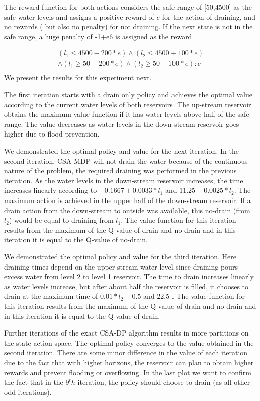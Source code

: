 The reward function for both actions considers the safe range of [50,4500] as the safe water levels and assigns a positive reward of $e$ for the action of draining, and no rewards ( but also no penalty) for not draining. If the next state is not in the safe range, a huge penalty of -1+e6 is assigned as the reward.

{\footnotesize
\begin{align*}
(l_1\leq 4500 - 200 * e) \wedge (l_2 \leq 4500 +100 *e) \\
\wedge (l_1\geq 50 - 200 * e) \wedge (l_2 \geq 50 +100 *e) : e \\
\end{align*}
}
We present the results for this experiment next. 

The first iteration starts with a drain only policy and achieves the optimal value according to the current water levels of both reservoirs. The up-stream reservoir obtains the maximum value function if it has water levels above half of the safe range. The value decreases as water levels in the down-stream reservoir goes higher due to flood prevention. 

We demonstrated the optimal policy and value for the next iteration. 
In the second iteration, CSA-MDP will not drain the water because of the continuous nature of the problem, the required draining was performed in the previous iteration. As the water levels in the down-stream reservoir increases, the time increases linearly according to $-0.1667 + 0.0033*l_1$ and $11.25 - 0.0025 *l_2$. The maximum action is achieved in the upper half of the down-stream reservoir. If a drain action from the down-stream to outside was available, this no-drain (from $l_2$) would be equal to draining from $l_1$. The value function for this iteration results from the maximum of the Q-value of drain and no-drain and in this iteration it is equal to the Q-value of no-drain. 


We demonstrated the optimal policy and value for the third iteration. Here draining times depend on the upper-stream water level since draining pours excess water from level 2 to level 1 reservoir. The time to drain increases linearly as water levels increase, but after about half the reservoir is filled, it chooses to drain at the maximum time of $0.01 *l_2 - 0.5$ and $22.5$ .  The value function for this iteration results from the maximum of the Q-value of drain and no-drain and in this iteration it is equal to the Q-value of drain. 

Further iterations of the exact CSA-DP algorithm results in more partitions on the state-action space. The optimal policy converges to the value obtained in the second iteration. There are some minor difference in the value of each iteration due to the fact that with higher horizons, the reservoir can plan to obtain higher rewards and prevent flooding or overflowing. In the last plot we want to confirm the fact that in the $9^th$ iteration, the policy should choose to drain (as all other odd-iterations). 
